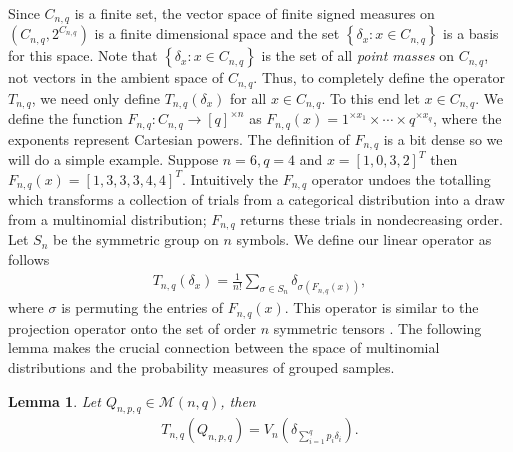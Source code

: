 \documentclass[aos,preprint]{imsart}
\def\l{\left}
\def\r{\right}
\def\sM{\pazocal{M}}
\def\sM{\mathscr{M}}
\theoremstyle{plain}
\newtheorem{lem}{Lemma}[section]
\theoremstyle{defintion}
\begin{document}
Since $C_{n,q}$ is a finite set, the vector space of finite signed measures on $\left( C_{n,q}, 2^{C_{n,q}} \right)$ is a finite dimensional space and the set $\left\{ \delta_x: x\in C_{n,q} \right\}$ is a basis for this space. Note that $\left\{ \delta_x: x\in C_{n,q} \right\}$ is the set of all {\em point masses} on $C_{n,q}$, not vectors in the ambient space of $C_{n,q}$. Thus, to completely define the operator $T_{n,q}$, we need only define $T_{n,q}\left( \delta_x \right)$ for all $x\in C_{n,q}$. To this end let $x \in C_{n,q}$. We define the function $F_{n,q}:C_{n,q} \to \left[ q \right]^{\times n}$ as $F_{n,q}\l(x\r) =1^{\times x_1}\times \cdots \times q^{\times x_q}$, where the exponents represent Cartesian powers. The definition of $F_{n,q}$ is a bit dense so we will do a simple example. Suppose $n=6,q=4$ and $x= \left[ 1,0,3,2 \right]^T$ then $F_{n,q}\l(x\r) = \left[ 1,3,3,3,4,4 \right]^T$. Intuitively the $F_{n,q}$ operator undoes the totalling which transforms a collection of trials from a categorical distribution into a draw from a multinomial distribution; $F_{ n,q }$ returns these trials in nondecreasing order. Let $S_n$ be the symmetric group on $n$ symbols. We define our linear operator as follows
\begin{eqnarray*}
	T_{n,q}\left( \delta_x \right) = \frac{1}{n!} \sum_{\sigma \in S_n} \delta_{ \sigma\l(F_{n,q}(x)\r)},
\end{eqnarray*}
where $\sigma$ is permuting the entries of $F_{n,q}\left( x \right)$.
This operator is similar to the projection operator onto the set of order $n$ symmetric tensors \cite{symtensorrank}. The following lemma makes the crucial connection between the space of multinomial distributions and the probability measures of grouped samples.
\begin{lem}\label{lem:mult}
	Let $Q_{n,p,q} \in \sM\left( n,q \right)$, then 
	\begin{eqnarray*}
		T_{n,q}\left( Q_{n,p,q} \right) = V_n\left( \delta_{\sum_{i=1}^q p_i \delta_i} \right).
	\end{eqnarray*}
\end{lem}
\end{document}
